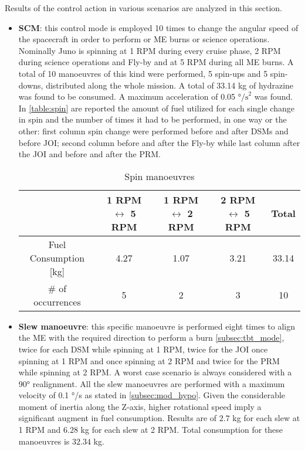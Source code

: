 Results of the control action in various scenarios are analyzed in this section.
\begin{itemize}
    \item \textbf{SCM}: this control mode is employed 10 times to change the angular speed of the spacecraft in order to perform or ME burns or science operations. Nominally Juno is spinning at 1 RPM during every cruise phase, 2 RPM during science operations and Fly-by and at 5 RPM during all ME burns. A total of 10 manoeuvres of this kind were performed, 5 spin-ups and 5 spin-downs, distributed along the whole mission.  A total of 33.14 kg of hydrazine was found to be consumed. A maximum acceleration of 0.05 °$\textrm{/s}^2$ was found. In \autoref{table:spin} are reported the amount of fuel utilized for each single change in spin and the number of times it had to be performed, in one way or the other: first column spin change were performed before and after DSMs and before JOI; second column before and after the Fly-by while last column after the JOI and before and after the PRM.
    
    \begin{table}[H]
        \renewcommand{\arraystretch}{1.3}
        \centering
        \small
        \begin{tabular}{|c|c|c|c|c|}
            \hline
            &\textbf{1 RPM $\leftrightarrow$ 5 RPM } & \textbf{1 RPM $\leftrightarrow$ 2 RPM } &\textbf{2 RPM $\leftrightarrow$ 5 RPM} & \textbf{Total} \\
            \hline
            \hline
            Fuel Consumption [kg] & 4.27 & 1.07 & 3.21 & 33.14 \\
            \hline
            \# of occurrences & 5 & 2 & 3 & 10 \\
            \hline
        \end{tabular}
        \caption{Spin manoeuvres}
        \label{table:spin}
    \end{table}
    \vspace*{-3mm}

    \item \textbf{Slew manoeuvre}: this specific manoeuvre is performed eight times to align the ME with the required direction to perform a burn \autoref{subsec:tbt_mode}, twice for each DSM while spinning at 1 RPM, twice for the JOI once spinning at 1 RPM and once spinning at 2 RPM and twice for the PRM while spinning at 2 RPM. A worst case scenario is always considered with a 90° realignment. \cite{LL_early_cruise} 
    All the slew manoeuvres are performed with a maximum velocity of 0.1 °/s as stated in \autoref{subsec:mod_hypo}. 
    Given the considerable moment of inertia along the Z-axis, higher rotational speed imply a significant augment in fuel consumption. Results are of $2.7$ kg for each slew at 1 RPM and $6.28$ kg for each slew at 2 RPM. Total consumption for these manoeuvres is $32.34$ kg. 
    

\end{itemize}
